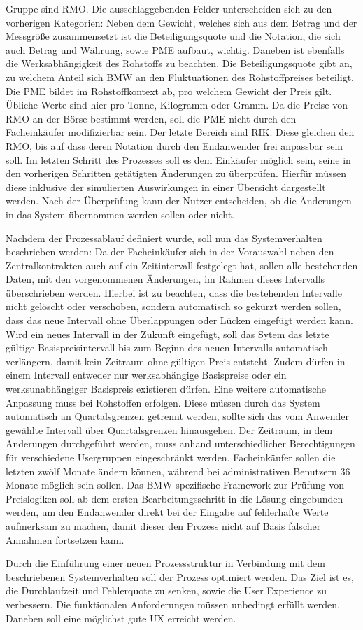 Gruppe sind RMO. Die ausschlaggebenden Felder unterscheiden sich zu den vorherigen Kategorien: Neben dem Gewicht, welches sich aus dem Betrag und der Messgrö\ss e zusammensetzt ist die Beteiligungsquote und die Notation, die sich auch Betrag und Währung, sowie PME aufbaut, wichtig. Daneben ist ebenfalls die Werksabhängigkeit des Rohstoffs zu beachten. Die Beteiligungsquote gibt an, zu welchem Anteil sich BMW an den Fluktuationen des Rohstoffpreises beteiligt. Die PME bildet im Rohstoffkontext ab, pro welchem Gewicht der Preis gilt. Übliche Werte sind hier pro Tonne, Kilogramm oder Gramm. Da die Preise von RMO an der Börse bestimmt werden, soll die PME nicht durch den Facheinkäufer modifizierbar sein. Der letzte Bereich sind RIK. Diese gleichen den RMO, bis auf dass deren Notation durch den Endanwender frei anpassbar sein soll. Im letzten Schritt des Prozesses soll es dem Einkäufer möglich sein, seine in den vorherigen Schritten getätigten Änderungen zu überprüfen. Hierfür müssen diese inklusive der simulierten Auswirkungen in einer Übersicht dargestellt werden. Nach der Überprüfung kann der Nutzer entscheiden, ob die Änderungen in das System übernommen werden sollen oder nicht.

Nachdem der Prozessablauf definiert wurde, soll nun das Systemverhalten beschrieben werden: Da der Facheinkäufer sich in der Vorauswahl neben den Zentralkontrakten auch auf ein Zeitintervall festgelegt hat, sollen alle bestehenden Daten, mit den vorgenommenen Änderungen, im Rahmen dieses Intervalls überschrieben werden. Hierbei ist zu beachten, dass die bestehenden Intervalle nicht gelöscht oder verschoben, sondern automatisch so gekürzt werden sollen, dass das neue Intervall ohne Überlappungen oder Lücken eingefügt werden kann. Wird ein neues Intervall in der Zukunft eingefügt, soll das Sytem das letzte gültige Basispreisintervall bis zum Beginn des neuen Intervalls automatisch verlängern, damit kein Zeitraum ohne gültigen Preis entsteht. Zudem dürfen in einem Intervall entweder nur werksabhängige Basispreise oder ein werksunabhängiger Basispreis existieren dürfen. Eine weitere automatische Anpassung muss bei Rohstoffen erfolgen. Diese müssen durch das System automatisch an Quartalsgrenzen getrennt werden, sollte sich das vom Anwender gewählte Intervall über Quartalsgrenzen hinausgehen. Der Zeitraum, in dem Änderungen durchgeführt werden, muss anhand unterschiedlicher Berechtigungen für verschiedene Usergruppen eingeschränkt werden. Facheinkäufer sollen die letzten zwölf Monate ändern können, während bei administrativen Benutzern 36 Monate möglich sein sollen. Das BMW-spezifische Framework zur Prüfung von Preislogiken soll ab dem ersten Bearbeitungsschritt in die Lösung eingebunden werden, um den Endanwender direkt bei der Eingabe auf fehlerhafte Werte aufmerksam zu machen, damit dieser den Prozess nicht auf Basis falscher Annahmen fortsetzen kann.

Durch die Einführung einer neuen Prozessstruktur in Verbindung mit dem beschriebenen Systemverhalten soll der Prozess optimiert werden. Das Ziel ist es, die Durchlaufzeit und Fehlerquote zu senken, sowie die User Experience zu verbessern. Die funktionalen Anforderungen müssen unbedingt erfüllt werden. Daneben soll eine möglichst gute UX erreicht werden.